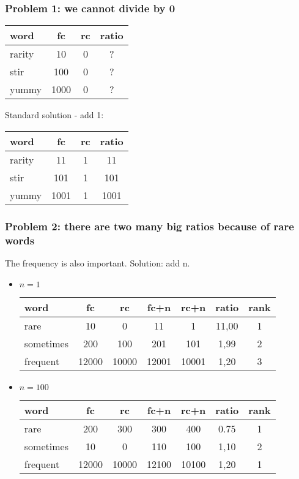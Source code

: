 \documentclass[svgnames]{beamer}
\begin{document}
\begin{frame}
  \frametitle{Problem 1:  we cannot divide by 0}
  \begin{tabular}[l]{lccc}
    word & fc & rc & ratio \\
    \hline
    rarity & 10 & 0 &  ? \\
    stir & 100 & 0 &  ? \\
    yummy & 1000 & 0 &  ? \\
  \end{tabular}
\end{frame}

\begin{frame}

Standard solution - add 1:
  \begin{tabular}[l]{lccc}
    word & fc & rc & ratio \\
    \hline
    rarity & 11 & 1 &  11 \\
    stir & 101 & 1 &  101 \\
    yummy & 1001 & 1 &  1001 \\
  \end{tabular}
\end{frame}

\begin{frame}
  \frametitle{Problem 2: there are two many big ratios because of rare words}
  The frequency is also important.   Solution: add n.

  \begin{itemize}
  \item $n=1$

  \begin{tabular}[l]{lcccccc}
    word & fc & rc & fc+n & rc+n & ratio & rank \\
    \hline
    rare & 10 & 0 & 11 & 1 & 11,00 & 1 \\
    sometimes & 200 & 100 & 201 & 101 & 1,99 & 2 \\
    frequent & 12000 & 10000 & 12001 & 10001 & 1,20 & 3 \\
  \end{tabular}
  
  \item $n=100$

  \begin{tabular}[l]{lcccccc}
    word & fc & rc & fc+n & rc+n & ratio & rank \\
    \hline
    rare & 200 & 300 & 300 & 400 & 0.75 & 1 \\
    sometimes & 10 & 0 & 110 & 100 & 1,10 &  2 \\
    frequent & 12000 & 10000 & 12100 & 10100 & 1,20 & 1 \\
  \end{tabular}

  \end{itemize}
  
\end{frame}
\end{document}
